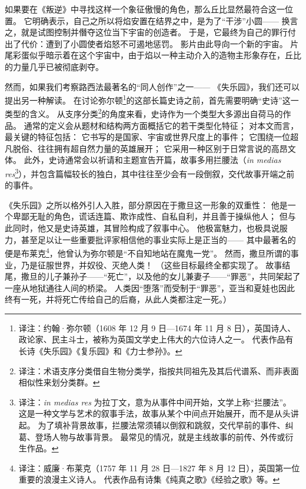 如果要在《叛逆》中寻找这样一个象征傲慢的角色，那么丘比显然最符合这一位置。
它明确表示，自己之所以将焰安置在结界之中，是为了“干涉”小圆——
换言之，就是试图控制并僭夺这位当下宇宙的创造者。
于是，它最终为自己的罪行付出了代价：遭到了小圆使者焰怒不可遏地惩罚。
影片由此导向一个新的宇宙。
片尾彩蛋似乎暗示着在这个宇宙中，由于焰以一种主动介入的造物主形象存在，丘比的力量几乎已被彻底剥夺。


然而，如果我们考察路西法最著名的“同人创作”之一——
《失乐园》，我们还可以提出另一种解读。
在讨论弥尔顿\footnote{%
    译注：约翰·弥尔顿（1608 年 12 月 9 日—1674 年 11 月 8 日），英国诗人、政论家、民主斗士，被称为英国文学史上伟大的六位诗人之一。
    代表作品有长诗《失乐园》《复乐园》和《力士参孙》。
}的这部长篇史诗之前，首先需要明确“史诗”这一类型的含义。
从支序分类\footnote{%
    译注：术语支序分类借自生物分类学，指按共同祖先及其后代谱系、而非表面相似性来划分类群。
}的角度来看，史诗作为一个类型大多源出自荷马的作品。
通常的定义会从题材和结构两方面概括它的若干类型化特征；
对本文而言，最关键的特征包括：
它书写的是国家、宇宙或世界尺度上的事件；
它围绕一位超凡脱俗、往往拥有超自然力量的英雄展开；
它采用一种区别于日常言说的高昂文体。
此外，史诗通常会以祈请和主题宣告开篇，故事多用拦腰法（\textlatin{\emph{in medias res}}\footnote{%
    译注：\textlatin{\emph{in medias res}} 为拉丁文，意为从事件中间开始，文学上称“拦腰法”。
    这是一种文学与艺术的叙事手法，故事从某个中间点开始展开，而不是从头讲起。
    为了填补背景故事，拦腰法常须辅以倒叙和跳叙，交代早前的事件、纠葛、登场人物与故事背景。
    最常见的情况，就是主线故事的前传、外传或衍生作品。
}），并包含篇幅较长的独白，其中往往至少会有一段倒叙，交代故事开端之前的事件\cite{flannagan1998paradise-lost-introduction}。

《失乐园》之所以格外引人入胜，部分原因在于撒旦这一形象的双重性：
他是一个卑鄙无耻的角色，谎话连篇、欺诈成性、自私自利，并且善于操纵他人；
但与此同时，他又是史诗英雄，其冒险构成了叙事中心。
他极富魅力，也极具说服力，甚至足以让一些重要批评家相信他的事业实际上是正当的——
其中最著名的便是布莱克\footnote{%
    译注：威廉·布莱克（1757 年 11 月 28 日—1827 年 8 月 12 日），英国第一位重要的浪漫主义诗人。
    代表作品有诗集《纯真之歌》《经验之歌》等。
}，他曾认为弥尔顿是“不自知地站在魔鬼一党”\cite{blake1994marriage-heaven-hell}。
然而，撒旦所谓的事业，乃是征服世界，并奴役、灭绝人类！
（这些目标最终全都实现了。
故事结尾，撒旦的儿子兼孙子——“死亡”，以及他的女儿兼妻子——“罪恶”，共同架起了一座从地狱通往人间的桥梁。
人类因“堕落”而受制于“罪恶”，亚当和夏娃也因此终有一死，并将死亡传给自己的后裔，从此人类都注定一死\cite{milton1998paradise-lost}。）

